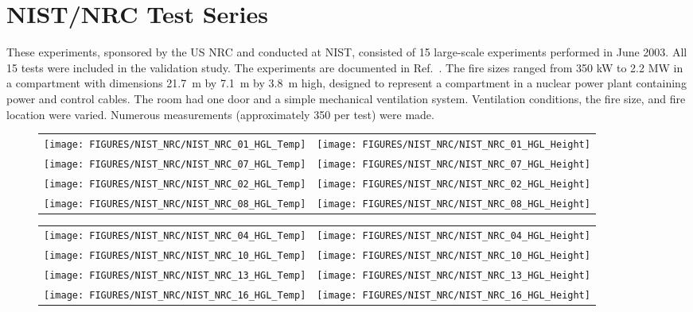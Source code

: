 
\section{NIST/NRC Test Series}

These experiments, sponsored by the US NRC and conducted at NIST, consisted of 15 large-scale experiments performed in June 2003. All 15 tests were included in the validation study. The experiments are documented in Ref.~\cite{Hamins:2005}. The fire sizes ranged from 350 kW to 2.2 MW in a compartment with dimensions 21.7~m by 7.1~m by 3.8~m high, designed to represent a compartment in a nuclear power plant containing power and control cables. The room had one door and a simple mechanical ventilation system. Ventilation conditions, the fire size, and fire location were varied. Numerous measurements (approximately 350 per test) were made.

\begin{figure}[p]
\begin{tabular*}{\textwidth}{l@{\extracolsep{\fill}}r}
\texttt{[image: FIGURES/NIST\_NRC/NIST\_NRC\_01\_HGL\_Temp]} &
\texttt{[image: FIGURES/NIST\_NRC/NIST\_NRC\_01\_HGL\_Height]} \\
\texttt{[image: FIGURES/NIST\_NRC/NIST\_NRC\_07\_HGL\_Temp]} &
\texttt{[image: FIGURES/NIST\_NRC/NIST\_NRC\_07\_HGL\_Height]} \\
\texttt{[image: FIGURES/NIST\_NRC/NIST\_NRC\_02\_HGL\_Temp]} &
\texttt{[image: FIGURES/NIST\_NRC/NIST\_NRC\_02\_HGL\_Height]} \\
\texttt{[image: FIGURES/NIST\_NRC/NIST\_NRC\_08\_HGL\_Temp]} &
\texttt{[image: FIGURES/NIST\_NRC/NIST\_NRC\_08\_HGL\_Height]}
\end{tabular*}
\end{figure}

\begin{figure}[p]
\begin{tabular*}{\textwidth}{l@{\extracolsep{\fill}}r}
\texttt{[image: FIGURES/NIST\_NRC/NIST\_NRC\_04\_HGL\_Temp]} &
\texttt{[image: FIGURES/NIST\_NRC/NIST\_NRC\_04\_HGL\_Height]} \\
\texttt{[image: FIGURES/NIST\_NRC/NIST\_NRC\_10\_HGL\_Temp]} &
\texttt{[image: FIGURES/NIST\_NRC/NIST\_NRC\_10\_HGL\_Height]} \\
\texttt{[image: FIGURES/NIST\_NRC/NIST\_NRC\_13\_HGL\_Temp]} &
\texttt{[image: FIGURES/NIST\_NRC/NIST\_NRC\_13\_HGL\_Height]} \\
\texttt{[image: FIGURES/NIST\_NRC/NIST\_NRC\_16\_HGL\_Temp]} &
\texttt{[image: FIGURES/NIST\_NRC/NIST\_NRC\_16\_HGL\_Height]}
\end{tabular*}
\end{figure}

